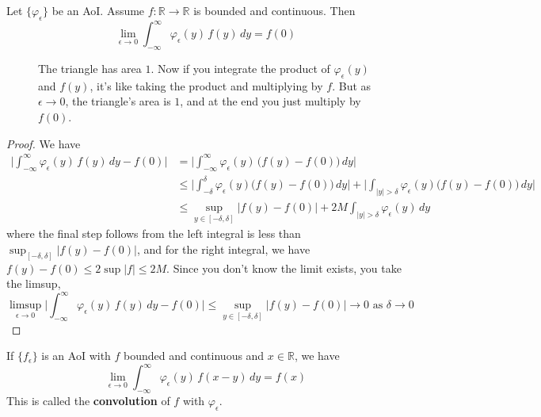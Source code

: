   \begin{theorem}
    Let $\{\varphi_\epsilon\}$ be an AoI. Assume $f: \mathbb{R} \to \mathbb{R}$ is bounded and continuous. Then 
    \begin{equation}
      \lim_{\epsilon \to 0} \int_{-\infty}^\infty \varphi_\epsilon (y) \, f(y) \,dy = f(0)
    \end{equation}

    \begin{figure}[H]
      \centering 
      \caption{The triangle has area $1$. Now if you integrate the product of $\varphi_\epsilon (y)$ and $f(y)$, it's like taking the product and multiplying by $f$. But as $\epsilon \to 0$, the triangle's area is $1$, and at the end you just multiply by $f(0)$. } 
      \label{fig:aoi}
    \end{figure}
  \end{theorem}
  \begin{proof}
    We have 
    \begin{align}
      \bigg| \int_{-\infty}^\infty \varphi_\epsilon (y) \, f(y) \,dy - f(0) \bigg| & = \bigg| \int_{-\infty}^\infty \varphi_\epsilon (y) \, \big( f(y) - f(0) \big) \,dy \bigg| \\ 
                                                                                   & \leq \bigg| \int_{-\delta}^{\delta} \varphi_\epsilon (y) \big( f(y) - f(0) \big) \,dy \bigg| + \bigg| \int_{|y| > \delta} \varphi_\epsilon (y) \big( f(y) - f(0) \big) \,dy \bigg| \\ 
                                                                                   & \leq \sup_{y \in [-\delta, \delta]} |f(y) - f(0)| + 2 M \int_{|y| > \delta} \varphi_\epsilon (y) \,dy 
    \end{align}
    where the final step follows from the left integral is less than $\sup_{[-\delta, \delta]} |f(y) - f(0)|$, and for the right integral, we have $f(y) - f(0) \leq 2 \sup |f| \leq 2 M$. Since you don't know the limit exists, you take the limsup, 
    \begin{equation}
      \limsup_{\epsilon \to 0} \bigg| \int_{-\infty}^\infty \varphi_\epsilon (y) \, f(y) \,dy - f(0) \bigg| \leq \sup_{y \in [-\delta, \delta]} |f(y) - f(0)| \to 0 \text{ as } \delta \to 0
    \end{equation}
  \end{proof}

  \begin{corollary}[Convolution]
    If $\{f_\epsilon\}$ is an AoI with $f$ bounded and continuous and $x \in \mathbb{R}$, we have 
    \begin{equation}
      \lim_{\epsilon \to 0} \int_{-\infty}^\infty \varphi_\epsilon (y) \, f(x - y) \,dy  = f(x)
    \end{equation}
    This is called the \textbf{convolution} of $f$ with $\varphi_\epsilon$. 
  \end{corollary}

